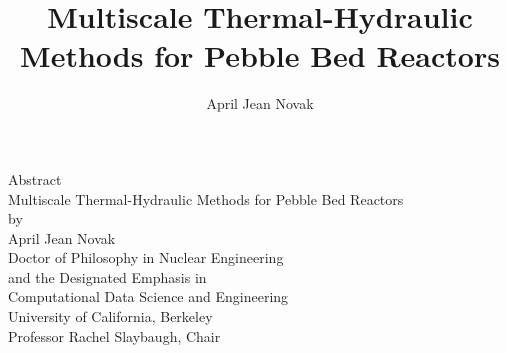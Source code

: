 \documentclass{ucbthesis}
\begin{document}
\title{Multiscale Thermal-Hydraulic Methods for Pebble Bed Reactors}
\author{April Jean Novak}


\maketitle
\approvalpage
\copyrightpage

\begin{centering}
Abstract\\
\vspace{1em}
Multiscale Thermal-Hydraulic Methods for Pebble Bed Reactors\\
\vspace{1em}
by\\
\vspace{1em}
April Jean Novak\\
\vspace{1em}
Doctor of Philosophy in Nuclear Engineering\\
\vspace{1em}
and the Designated Emphasis in\\
\vspace{1em}
Computational Data Science and Engineering\\
\vspace{1em}
University of California, Berkeley\\
\vspace{1em}
Professor Rachel Slaybaugh, Chair\\
\end{centering}
\vspace{2em}
\end{document}

